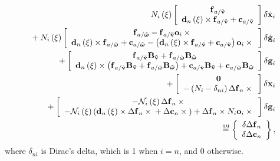 \begin{align}
	N_i\plbr{\xi} \sqbr{\matr{c}{
		\T{f}_{a/\tilde{\T{v}}} \\
		\T{d}_n\plbr{\xi} \times \T{f}_{a/\tilde{\T{v}}}
		+ \T{c}_{a/\tilde{\T{v}}}
	}} \delta\dot{\T{x}}_i
	\nonumber \\
%
	\mbox{}
	+ N_i\plbr{\xi} \sqbr{\matr{c}{
		\T{f}_{a/\tilde{\T{\omega}}}
		- \T{f}_{a/\tilde{\T{v}}} \T{o}_i \times{} \\
		\T{d}_n\plbr{\xi} \times \T{f}_{a/\tilde{\T{\omega}}}
		+ \T{c}_{a/\tilde{\T{\omega}}}
		- \plbr{
			\T{d}_n\plbr{\xi} \times \T{f}_{a/\tilde{\T{v}}}
			+ \T{c}_{a/\tilde{\T{v}}}
		} \T{o}_i \times{}
	}} \delta\dot{\T{g}}_i
	\nonumber \\
%
	\mbox{}
	+ \sqbr{\matr{c}{
		\T{f}_{a/\tilde{\T{v}}} \TT{B}_{\tilde{\T{v}}}
			+ \T{f}_{a/\tilde{\T{\omega}}} \TT{B}_{\tilde{\T{\omega}}} \\
		\T{d}_n\plbr{\xi} \times \plbr{
			\T{f}_{a/\tilde{\T{v}}} \TT{B}_{\tilde{\T{v}}}
				+ \T{f}_{a/\tilde{\T{\omega}}} \TT{B}_{\tilde{\T{\omega}}}
		}
		+ \T{c}_{a/\tilde{\T{v}}} \TT{B}_{\tilde{\T{v}}}
			+ \T{c}_{a/\tilde{\T{\omega}}} \TT{B}_{\tilde{\T{\omega}}}
	}} \delta\T{g}_i
	\nonumber \\
%
	\mbox{}
	+ \sqbr{\matr{c}{
		\TT{0} \\
		- \plbr{
			N_i - \delta_{ni}
		} \Delta\T{f}_n \times{}
	}} \delta\T{x}_i
	\nonumber \\
%
	\mbox{}
	+ \sqbr{\matr{c}{
		- \mathcal{N}_i\plbr{\xi} \Delta\T{f}_n \times{} \\
		- \mathcal{N}_i\plbr{\xi} \plbr{
			\T{d}_n\plbr{\xi} \times \Delta\T{f}_n \times{}
			+ \Delta\T{c}_n \times{}
		}
		+ \Delta\T{f}_n \times N_i \T{o}_i \times{}
	}} \delta\T{g}_i
	\nonumber \\
%
	\equu
	\cubr{\cvvect{
		\delta\Delta\T{f}_n \\
		\delta\Delta\T{c}_n
	}}
	,
\end{align}
where $\delta_{ni}$ is Dirac's delta, which is 1 when $i=n$, and 0 otherwise.





